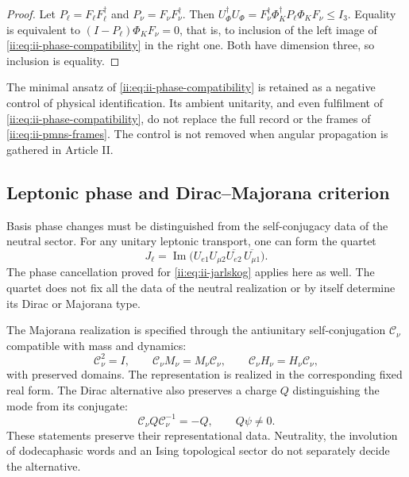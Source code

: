 \begin{proof}
Let \(P_\ell=F_\ell F_\ell^\dagger\) and \(P_\nu=F_\nu F_\nu^\dagger\). Then \(U_\Phi^\dagger U_\Phi
=F_\nu^\dagger\Phi_K^\dagger P_\ell\Phi_KF_\nu\le I_3\). Equality is equivalent to \((I-P_\ell)\Phi_KF_\nu=0\), that is, to inclusion of the left image of \eqref{ii:eq:ii-phase-compatibility} in the right one. Both have dimension three, so inclusion is equality.
\end{proof}

The minimal ansatz of \eqref{ii:eq:ii-phase-compatibility} is retained as a negative control of physical identification. Its ambient unitarity, and even fulfilment of \eqref{ii:eq:ii-phase-compatibility}, do not replace the full record or the frames of \eqref{ii:eq:ii-pmns-frames}. The control is not removed when angular propagation is gathered in Article II.

\subsection{Leptonic phase and Dirac--Majorana criterion}

Basis phase changes must be distinguished from the self-conjugacy data of the neutral sector. For any unitary leptonic transport, one can form the quartet
\begin{equation}
 J_\ell=\operatorname{Im}
 \bigl(U_{e1}U_{\mu2}\overline{U_{e2}}\,
                        \overline{U_{\mu1}}\bigr).
 \label{ii:eq:ii-leptonic-quartet}
\end{equation}
The phase cancellation proved for \eqref{ii:eq:ii-jarlskog} applies here as well. The quartet does not fix all the data of the neutral realization or by itself determine its Dirac or Majorana type.

The Majorana realization is specified through the antiunitary self-conjugation \(\mathcal C_\nu\) compatible with mass and dynamics:
\begin{equation}
 \mathcal C_\nu^2=I,\qquad
 \mathcal C_\nu M_\nu=M_\nu\mathcal C_\nu,\qquad
 \mathcal C_\nu H_\nu=H_\nu\mathcal C_\nu,
 \label{ii:eq:ii-majorana-compatibility}
\end{equation}
with preserved domains. The representation is realized in the corresponding fixed real form. The Dirac alternative also preserves a charge \(Q\) distinguishing the mode from its conjugate:
\begin{equation}
 \mathcal C_\nu Q\mathcal C_\nu^{-1}=-Q,\qquad Q\psi\ne0.
 \label{ii:eq:ii-dirac-charge}
\end{equation}
These statements preserve their representational data. Neutrality, the involution of dodecaphasic words and an Ising topological sector do not separately decide the alternative.

